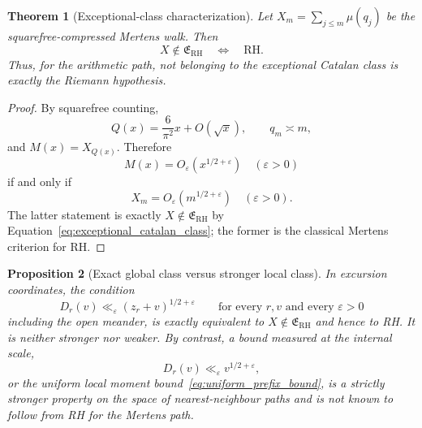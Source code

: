 \documentclass[11pt]{amsart}
\numberwithin{equation}{section}
\theoremstyle{plain}
\newtheorem{theorem}{Theorem}[section]
\newtheorem{proposition}[theorem]{Proposition}
\theoremstyle{definition}
\theoremstyle{remark}
\newcommand{\Mob}{\mu}
\newcommand{\Mert}{M}
\newcommand{\eps}{\varepsilon}
\begin{document}
\begin{theorem}[Exceptional-class characterization]
\label{thm:exceptional_class_rh}
Let $X_m=\sum_{j\leq m}\Mob(q_j)$ be the squarefree-compressed Mertens walk.
Then
\begin{equation}
\boxed{
X\notin\mathfrak E_{\mathrm{RH}}
\quad\Longleftrightarrow\quad
\mathrm{RH}.}
\label{eq:not_exceptional_iff_rh}
\end{equation}
Thus, for the arithmetic path, not belonging to the exceptional Catalan class
is exactly the Riemann hypothesis.
\end{theorem}

\begin{proof}
By squarefree counting,
\begin{equation}
Q(x)=\frac{6}{\pi^2}x+O(\sqrt{x}),
\qquad q_m\asymp m,
\end{equation}
and $\Mert(x)=X_{Q(x)}$.  Therefore
\begin{equation}
\Mert(x)=O_\eps(x^{1/2+\eps})\quad(\eps>0)
\end{equation}
if and only if
\begin{equation}
X_m=O_\eps(m^{1/2+\eps})\quad(\eps>0).
\end{equation}
The latter statement is exactly
$X\notin\mathfrak E_{\mathrm{RH}}$ by
Equation~\eqref{eq:exceptional_catalan_class}; the former is the classical
Mertens criterion for RH.
\end{proof}

\begin{proposition}[Exact global class versus stronger local class]
\label{prop:global_versus_local_catalan}
In excursion coordinates, the condition
\begin{equation}
D_r(v)\ll_\eps (z_r+v)^{1/2+\eps}
\qquad\text{for every $r,v$ and every $\eps>0$}
\label{eq:global_excursion_rh_scale}
\end{equation}
including the open meander, is exactly equivalent to
$X\notin\mathfrak E_{\mathrm{RH}}$ and hence to RH.  It is neither stronger
nor weaker.  By contrast, a bound measured at the internal scale,
\begin{equation}
D_r(v)\ll_\eps v^{1/2+\eps},
\label{eq:local_brownian_height}
\end{equation}
or the uniform local moment bound~\eqref{eq:uniform_prefix_bound}, is a
strictly stronger property on the space of nearest-neighbour paths and is not
known to follow from RH for the Mertens path.
\end{proposition}
\end{document}
